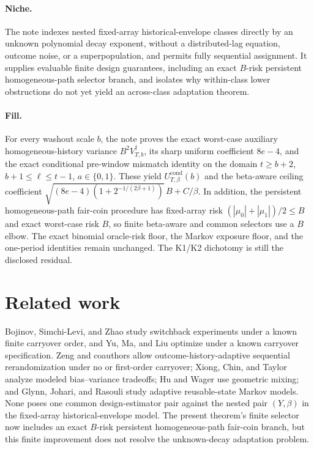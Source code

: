 \documentclass{article}
\begin{document}
\paragraph{Niche.} The note indexes nested fixed-array historical-envelope classes directly by an unknown polynomial decay exponent, without a distributed-lag equation, outcome noise, or a superpopulation, and permits fully sequential assignment. It supplies evaluable finite design guarantees, including an exact \(B\)-risk persistent homogeneous-path selector branch, and isolates why within-class lower obstructions do not yet yield an across-class adaptation theorem.

\paragraph{Fill.} For every washout scale \(b\), the note proves the exact worst-case auxiliary homogeneous-history variance \(B^2V_{T,b}^{\dagger}\), its sharp uniform coefficient \(8e-4\), and the exact conditional pre-window mismatch identity on the domain \(t\ge b+2\), \(b+1\le\ell\le t-1\), \(a\in\{0,1\}\). These yield \(U_{T,\beta}^{\mathrm{cond}}(b)\) and the beta-aware ceiling coefficient \(\sqrt{(8e-4)(1+2^{-1/(2\beta+1)})}\,B+C/\beta\). In addition, the persistent homogeneous-path fair-coin procedure has fixed-array risk \((|\mu_0|+|\mu_1|)/2\le B\) and exact worst-case risk \(B\), so finite beta-aware and common selectors use a \(B\) elbow. The exact binomial oracle-risk floor, the Markov exposure floor, and the one-period identities remain unchanged. The K1/K2 dichotomy is still the disclosed residual.

\section{Related work}

Bojinov, Simchi-Levi, and Zhao study switchback experiments under a known finite carryover order, and Yu, Ma, and Liu optimize under a known carryover specification. Zeng and coauthors allow outcome-history-adaptive sequential rerandomization under no or first-order carryover; Xiong, Chin, and Taylor analyze modeled bias--variance tradeoffs; Hu and Wager use geometric mixing; and Glynn, Johari, and Rasouli study adaptive reusable-state Markov models. None poses one common design-estimator pair against the nested pair \((Y,\beta)\) in the fixed-array historical-envelope model. The present theorem's finite selector now includes an exact \(B\)-risk persistent homogeneous-path fair-coin branch, but this finite improvement does not resolve the unknown-decay adaptation problem.
\end{document}
